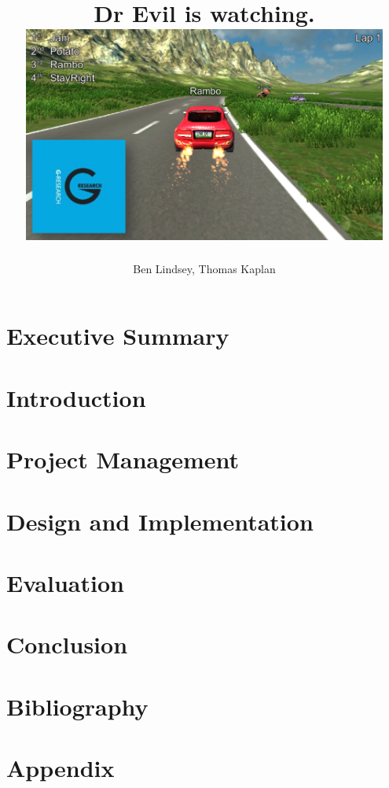 \documentclass[11pt]{report}
\title{	
  {\huge \project}\\
  {\large Dr Evil is watching.}\\[2em]
  {\centering \includegraphics[width=0.9\textwidth]{coverpic.png}}
}
\author{Ben Lindsey, Thomas Kaplan}
\begin{document}
\maketitle

\chapter*{Executive Summary}


\tableofcontents

\chapter{Introduction}


\chapter{Project Management}


\chapter{Design and Implementation}


\chapter{Evaluation}


\chapter{Conclusion}


\chapter{Bibliography}
\printbibliography[heading=none]

\appendix
\chapter{Appendix}

\end{document}

